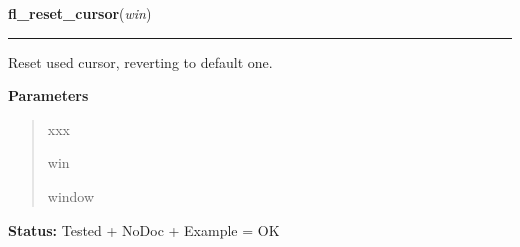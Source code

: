 \hspace{.8\funcindent}\begin{boxedminipage}{\funcwidth}

    \raggedright \textbf{fl\_reset\_cursor}(\textit{win})

    \vspace{-1.5ex}

    \rule{\textwidth}{0.5\fboxrule}
\setlength{\parskip}{2ex}
    Reset used cursor, reverting to default one.

\setlength{\parskip}{1ex}
      \textbf{Parameters}
      \vspace{-1ex}

      \begin{quote}
        \begin{Ventry}{xxx}

          \item[win]

          window

        \end{Ventry}

      \end{quote}

\textbf{Status:} Tested + NoDoc + Example = OK



    \end{boxedminipage}

    \label{xformslib:library:fl_add_dial}

    \vspace{0.5ex}

